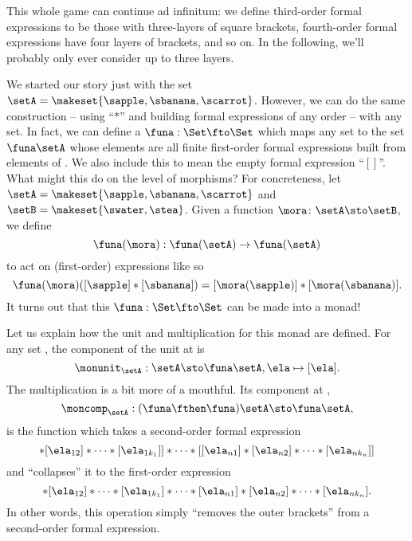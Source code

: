This whole game can continue ad infinitum: we define third-order formal expressions to be those with three-layers of square brackets, fourth-order formal expressions have four layers of brackets, and so on.
In the following, we'll probably only ever consider up to three layers.

We started our story just with the set $\setA = \makeset{ \sapple, \sbanana, \scarrot }$.
However, we can do the same construction -- using ``$*$'' and building formal expressions of any order -- with any set.
In fact, we can define a  $\funa: \Set \fto \Set$ which maps any set \setA to the set $\funa \setA$ whose elements are all finite first-order formal expressions built from elements of \setA.
We also include this to mean the empty formal expression ``$[ ]$''.
What might this  do on the level of morphisms?
For concreteness, let $\setA = \makeset{ \sapple, \sbanana, \scarrot } $ and $\setB = \makeset{ \swater, \stea }$.
Given a function $\mora \colon \setA \sto \setB$, we define
\begin{equation}
    \funa(\mora) : \funa(\setA) \to \funa(\setA)
\end{equation}
to act on (first-order) expressions like so
\begin{equation}
    \funa(\mora)([\sapple]*[\sbanana]) = [\mora(\sapple)]*[\mora(\sbanana)].
\end{equation}
It turns out that this  $\funa: \Set \fto \Set$ can be made into a monad!

Let us explain how the unit and multiplication for this monad are defined.
For any set \setA, the component of the unit at \setA is
\begin{equation}
    \monunit_\setA : \setA \sto \funa \setA, \ela \mapsto [\ela].
\end{equation}
The multiplication is a bit more of a mouthful.
Its component at \setA,
\begin{equation}
    \moncomp_\setA : (\funa \fthen \funa)\setA \sto \funa \setA,
\end{equation}
is the function which takes a second-order formal expression
\begin{equation}
    [[\ela_{11}]* [\ela_{12}] * \cdots * [\ela_{1k_1}]] * \cdots * [[\ela_{n1}]* [\ela_{n2}] * \cdots * [\ela_{nk_n}]]
\end{equation}
and ``collapses'' it to the first-order expression
\begin{equation}
    [\ela_{11}]
    * [\ela_{12}] * \cdots * [\ela_{1k_1}] * \cdots * [\ela_{n1}]* [\ela_{n2}] * \cdots * [\ela_{nk_n}].
\end{equation}
In other words, this operation simply ``removes the outer brackets'' from a second-order formal expression.

